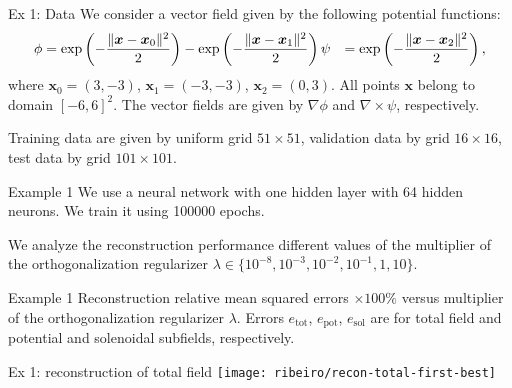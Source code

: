 \documentclass[11pt,aspectratio=169,t]{beamer}
\def\\{}%
\renewcommand{\vec}[1]{\boldsymbol{#1}}
\DeclarePairedDelimiter\norm{\lVert}{\rVert}
\newcommand{\Grad}{\nabla}
\newcommand{\Curl}{\nabla \! \times \!}
\begin{document}
\begin{frame}{Ex 1: Data}
We consider a vector field given by the following potential
functions:
\begin{align}
\phi &= \exp\left( - \frac{\norm{\vec x - \vec x_0}{}^2}{2} \right)
    - \exp\left( - \frac{\norm{\vec x - \vec x_1}{}^2}{2} \right) \\
\psi &= \exp\left( - \frac{\norm{\vec x - \vec x_2}{}^2}{2} \right),
\end{align}
where $\vec x_0 = (3, -3)$, $\vec x_1 = (-3, -3)$, $\vec x_2 = (0, 3)$.
All points $\vec x$ belong to domain $[-6, 6]^2$.
The vector fields are given by $\Grad \phi$ and $\Curl \psi$, respectively.

Training data are given by uniform grid $51 \times 51$, validation data
by grid $16 \times 16$, test data by grid $101 \times 101$.
\end{frame}

\begin{frame}{Example 1}
We use a neural network with one hidden layer with 64 hidden neurons.
We train it using \num{100000} epochs.

We analyze the reconstruction performance different values of the multiplier
of the orthogonalization regularizer
$\lambda \in \{  10^{-8}, 10^{-3}, 10^{-2}, 10^{-1}, 1, 10 \}$.
\end{frame}

\begin{frame}{Example 1}
\centering
Reconstruction relative mean squared errors $\times 100\%$ versus multiplier of the
orthogonalization regularizer $\lambda$.
Errors $e_{\text{tot}}$, $e_{\text{pot}}$, $e_{\text{sol}}$ are for total field
and potential and solenoidal subfields, respectively.

\centering

\end{frame}

\begin{frame}{Ex 1: reconstruction of total field}
\centering
\vspace{0.5cm}
\texttt{[image: ribeiro/recon-total-first-best]}
\end{frame}
\end{document}
